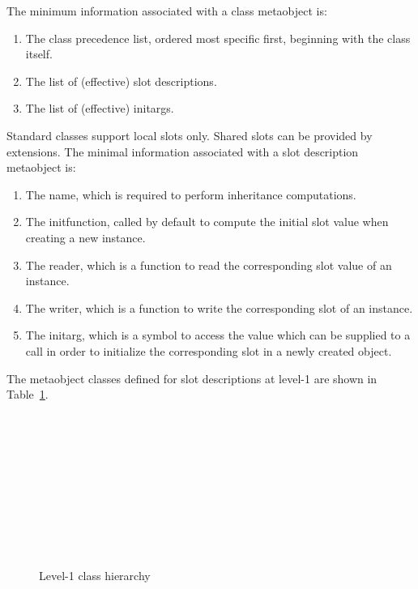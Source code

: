 \begin{optDefinition}
The minimum information associated with a class metaobject is:
%
\begin{enumerate}
    \item The class precedence list, ordered most specific first, beginning with
    the class itself.
    \item The list of (effective) slot descriptions.
    \item The list of (effective) initargs.
\end{enumerate}
%
Standard classes support local slots only. Shared slots can be provided by
extensions.  The minimal information associated with a slot description
metaobject is:
%
\begin{enumerate}
    \item The name, which is required to perform inheritance computations.
    \item The initfunction, called by default to compute the initial slot value
    when creating a new instance.
    \item The reader, which is a function to read the corresponding slot value
    of an instance.
    \item The writer, which is a function to write the corresponding slot of an
    instance.
    \item The initarg, which is a symbol to access the value which can be
    supplied to a  call in order to initialize the corresponding slot
    in a newly created object.
\end{enumerate}
%
The metaobject classes defined for slot descriptions at level-1 are shown in
Table~\ref{level-1-class-hierarchy}.
%
\begin{figure}
{\tt%
 \\
\tts{} \\
\tts{}  \\
 \\
\tts{} \\
 \\
\tts{} \\
\tts\tts{} \\
 \\
\tts{}%
}%
\caption{Level-1 class hierarchy}
\label{level-1-class-hierarchy}
\end{figure}


\end{optDefinition}
